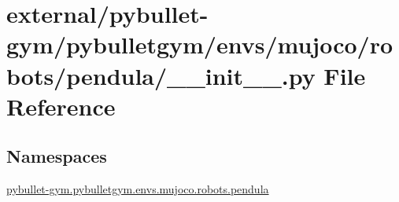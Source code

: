 \hypertarget{external_2pybullet-gym_2pybulletgym_2envs_2mujoco_2robots_2pendula_2____init_____8py}{}\section{external/pybullet-\/gym/pybulletgym/envs/mujoco/robots/pendula/\+\_\+\+\_\+init\+\_\+\+\_\+.py File Reference}
\label{external_2pybullet-gym_2pybulletgym_2envs_2mujoco_2robots_2pendula_2____init_____8py}
\subsection*{Namespaces}
\begin{DoxyCompactItemize}
\item 
 \hyperlink{namespacepybullet-gym_1_1pybulletgym_1_1envs_1_1mujoco_1_1robots_1_1pendula}{pybullet-\/gym.\+pybulletgym.\+envs.\+mujoco.\+robots.\+pendula}
\end{DoxyCompactItemize}

